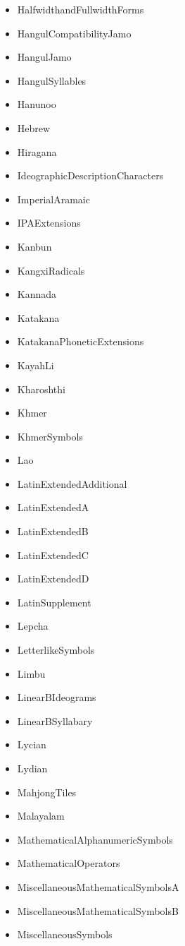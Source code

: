 ﻿\documentclass{article}
\newenvironment{itemlist}{%
  \begin{itemize}
	\setlength{\itemsep}{0pt}
	\setlength{\parsep}{0pt}
	\setlength{\topsep}{0pt}
	\setlength{\partopsep}{0pt}
	\setlength{\parskip}{0pt}
	\setlength{\labelsep}{5pt}}%
{
  \end{itemize}}
\begin{document}
\begin{multicols}{2}
\begin{itemlist}
				\item HalfwidthandFullwidthForms
				\item HangulCompatibilityJamo
				\item HangulJamo
				\item HangulSyllables
				\item Hanunoo
				\item Hebrew
				\item Hiragana
				\item IdeographicDescriptionCharacters
				\item ImperialAramaic
				\item IPAExtensions
				\item Kanbun
				\item KangxiRadicals
				\item Kannada
				\item Katakana
				\item KatakanaPhoneticExtensions
				\item KayahLi
				\item Kharoshthi
				\item Khmer
				\item KhmerSymbols
				\item Lao
				\item LatinExtendedAdditional
				\item LatinExtendedA
				\item LatinExtendedB
				\item LatinExtendedC
				\item LatinExtendedD
				\item LatinSupplement
				\item Lepcha
				\item LetterlikeSymbols
				\item Limbu
				\item LinearBIdeograms
				\item LinearBSyllabary
				\item Lycian
				\item Lydian
				\item MahjongTiles
				\item Malayalam
				\item MathematicalAlphanumericSymbols
				\item MathematicalOperators
				\item MiscellaneousMathematicalSymbolsA
				\item MiscellaneousMathematicalSymbolsB
				\item MiscellaneousSymbols

\end{itemlist}
\end{multicols}
\end{document}
